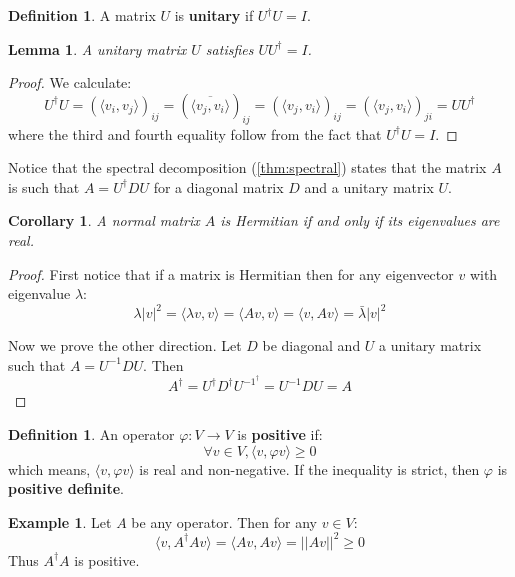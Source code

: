 \documentclass[12pt]{article}
\theoremstyle{plain}
\newtheorem{lemma}[thm]{Lemma}
\newtheorem{cor}[thm]{Corollary}
\theoremstyle{definition}
\newtheorem{defn}[thm]{Definition} %
\newtheorem{example}[thm]{Example}
\newcommand{\lto}{\longrightarrow}
\begin{document}
\begin{defn}
A matrix $U$ is \textbf{unitary} if $U^\dagger U = I$. 
\end{defn}
\begin{lemma}
A unitary matrix $U$ satisfies $UU^\dagger = I$.
\end{lemma}
\begin{proof}
We calculate:
\begin{equation}
U^\dagger U = (\langle v_i, v_j\rangle)_{ij}= (\overline{\langle v_j, v_i \rangle})_{ij}= (\langle v_j, v_i \rangle)_{ij}= (\langle v_j, v_i \rangle)_{ji}= UU^\dagger
\end{equation}
where the third and fourth equality follow from the fact that $U^\dagger U = I$.
\end{proof}
Notice that the spectral decomposition (\ref{thm:spectral}) states that the matrix $A$ is such that $A = U^\dagger DU$ for a diagonal matrix $D$ and a unitary matrix $U$.
\begin{cor}
A normal matrix $A$ is Hermitian if and only if its eigenvalues are real.
\end{cor}
\begin{proof}
First notice that if a matrix is Hermitian then for any eigenvector $v$ with eigenvalue $\lambda$:
\begin{equation}
\lambda |v|^2 = \langle \lambda v,v \rangle = \langle Av, v \rangle = \langle v,Av \rangle = \bar{\lambda}|v|^2
\end{equation}

Now we prove the other direction.  Let $D$ be diagonal and $U$ a unitary matrix such that $A = U^{-1}DU$. Then
\begin{equation}
A^\dagger = U^{\dagger}D^\dagger U^{-1^\dagger} = U^{-1}DU = A
\end{equation}
\end{proof}
\begin{defn}
An operator $\varphi: V \lto V$ is \textbf{positive} if:
\begin{equation}
\forall v \in V, \langle v, \varphi v\rangle \geq 0
\end{equation}
which means, $\langle v, \varphi v\rangle$ is real and non-negative. If the inequality is strict, then $\varphi$ is \textbf{positive definite}.
\end{defn}
\begin{example}
Let $A$ be any operator. Then for any $v \in V$:
\begin{equation}
\langle v, A^\dagger Av\rangle = \langle Av, Av \rangle = ||Av||^2 \geq 0
\end{equation}
Thus $A^\dagger A$ is positive.
\end{example}
\end{document}
